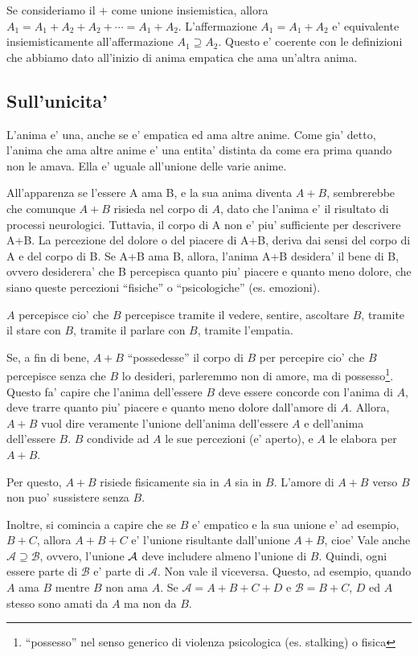 Se consideriamo il $+$ come unione insiemistica, allora $A_1=A_1+A_2+A_2+\cdots = A_1+A_2$. L'affermazione $A_1=A_1+A_2$ e' equivalente insiemisticamente all'affermazione $A_1 \supseteq A_2$. Questo e' coerente con le definizioni che abbiamo dato all'inizio di anima empatica che ama un'altra anima.

\subsection{Sull'unicita'}

L'anima e' una, anche se e' empatica ed ama altre anime. Come gia' detto, l'anima che ama altre anime e' una entita' distinta da come era prima quando non le amava. Ella e' uguale all'unione delle varie anime. 

All'apparenza se l'essere A ama B, e la sua anima diventa $A+B$, sembrerebbe che comunque $A+B$ risieda nel corpo di $A$, dato che l'anima e' il risultato di processi neurologici. Tuttavia, il corpo di A non e' piu' sufficiente per descrivere A+B. La percezione del dolore o del piacere di A+B, deriva dai sensi del corpo di A e del corpo di B. Se A+B ama B, allora, l'anima A+B desidera' il bene di B, ovvero desiderera' che B percepisca quanto piu' piacere e quanto meno dolore, che siano queste percezioni ``fisiche'' o ``psicologiche'' (es. emozioni). 

$A$ percepisce cio' che  $B$ percepisce tramite il vedere, sentire, ascoltare $B$, tramite il stare con $B$, tramite il parlare con $B$, tramite l'empatia.

Se, a fin di bene, $A+B$ ``possedesse'' il corpo di $B$ per percepire cio' che $B$ percepisce senza che $B$ lo desideri, parleremmo non di amore, ma di possesso\footnote{``possesso'' nel senso generico di violenza psicologica (es. stalking) o fisica}. Questo fa' capire che l'anima dell'essere $B$ deve essere concorde con l'anima di $A$, deve trarre quanto piu' piacere e quanto meno dolore dall'amore di $A$. Allora, $A+B$ vuol dire veramente l'unione dell'anima dell'essere $A$ e dell'anima dell'essere $B$. $B$ condivide ad $A$ le sue percezioni (e' aperto), e $A$ le elabora per $A+B$. 

Per questo, $A+B$ risiede fisicamente sia in $A$ sia in $B$. L'amore di $A+B$ verso $B$ non puo' sussistere senza $B$. 

Inoltre, si comincia a capire che se $B$ e' empatico e la sua unione e' ad esempio, $B+C$, allora $A+B+C$ e' l'unione risultante dall'unione $A+B$, cioe'
Vale anche $\mathcal{A} \supseteq \mathcal{B}$, ovvero, l'unione $\mathcal{A}$ deve includere almeno l'unione di $B$. Quindi, ogni essere parte di $\mathcal{B}$ e' parte di $\mathcal{A}$. Non vale il viceversa. Questo, ad esempio, quando $A$ ama $B$ mentre $B$ non ama $A$. Se $\mathcal{A}=A+B+C+D$ e $\mathcal{B}=B+C$, $D$ ed $A$ stesso sono amati da $A$ ma non da $B$.

